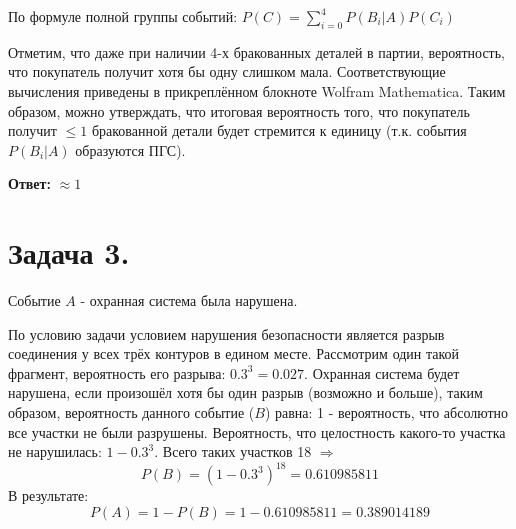 По формуле полной группы событий: $P(C) = \sum\limits_{i=0}^{4} P(B_i|A)P(C_i)$

Отметим, что даже при наличии 4-х бракованных деталей в партии, вероятность, что покупатель получит хотя бы одну слишком мала. Соответствующие вычисления приведены в прикреплённом блокноте Wolfram Mathematica. Таким образом, можно утверждать, что итоговая вероятность того, что покупатель получит $\le 1$ бракованной детали будет стремится к единицу (т.к. события $P(B_i|A)$ образуются ПГС).

\noindent \textbf{Ответ:} $\approx 1$

\section*{Задача 3.}

\begin{figure}[H]
\end{figure}

Событие $A$ - охранная система была нарушена.

По условию задачи условием нарушения безопасности является разрыв соединения у всех трёх контуров в едином месте. Рассмотрим один такой фрагмент, вероятность его разрыва: $0.3^3 = 0.027$. Охранная система будет нарушена, если произошёл хотя бы один разрыв (возможно и больше), таким образом, вероятность данного событие ($B$) равна: 1 - вероятность, что абсолютно все участки не были разрушены. Вероятность, что целостность какого-то участка не нарушилась: $1-0.3^3$. Всего таких участков 18 $\Rightarrow$
\[ P(B) = (1 - 0.3^3)^{18} = 0.610985811 \]
В результате:
\[ P(A) = 1 - P(B) = 1 - 0.610985811 = 0.389014189 \]

